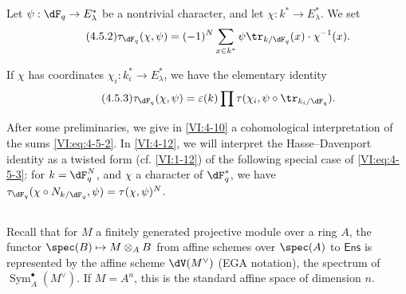 Let $\psi:\dF_q\to E_\lambda^\ast$ be a nontrivial character, and let 
$\chi:k^\ast \to E_\lambda^\ast$. We set 
\begin{equation*}\tag{4.5.2}\label{VI:eq:4-5-2}
  \tau_{\dF_q}(\chi,\psi) = (-1)^N \sum_{x\in k^\ast} \psi \tr_{k/\dF_q}(x) \cdot \chi^{-1}(x) \text{.} 
\end{equation*}

If $\chi$ has coordinates $\chi_i:k_i^\ast \to E_\lambda^\ast$, we 
have the elementary identity 
\begin{equation*}\tag{4.5.3}\label{VI:eq:4-5-3}
  \tau_{\dF_q}(\chi,\psi) = \varepsilon(k) \prod \tau(\chi_i,\psi\circ \tr_{k_i/\dF_q}) \text{.}
\end{equation*}

After some preliminaries, we give in \ref{VI:4-10} a 
cohomological interpretation of the sums \eqref{VI:eq:4-5-2}. In 
\ref{VI:4-12}, we will interpret the Hasse--Davenport identity as a 
twisted form (cf. \ref{VI:1-12}) of the following special case of 
\eqref{VI:eq:4-5-3}: for $k=\dF_q^N$, and $\chi$ a character of 
$\dF_q^\ast$, we have 
$\tau_{\dF_q}(\chi\circ N_{k/\dF_q},\psi)=\tau(\chi,\psi)^N$. 





\subsection{}\label{VI:4-6}

Recall that for $M$ a finitely generated projective module over a ring $A$, the 
functor $\spec(B)\mapsto M\otimes_A B$ from affine schemes over $\spec(A)$ 
to $\mathsf{Ens}$ is represented by the affine scheme $\dV(M^\vee)$ 
(EGA notation), the spectrum of $\operatorname{Sym}_A^\bullet(M^\vee)$. If 
$M=A^n$, this is the standard affine space of dimension $n$. 

